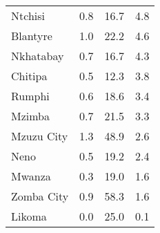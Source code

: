 \begin{tabular}{lrrr}
Ntchisi        &         0.8 &         16.7 &              4.8 \\
Blantyre       &         1.0 &         22.2 &              4.6 \\
Nkhatabay      &         0.7 &         16.7 &              4.3 \\
Chitipa        &         0.5 &         12.3 &              3.8 \\
Rumphi         &         0.6 &         18.6 &              3.4 \\
Mzimba         &         0.7 &         21.5 &              3.3 \\
Mzuzu City     &         1.3 &         48.9 &              2.6 \\
Neno           &         0.5 &         19.2 &              2.4 \\
Mwanza         &         0.3 &         19.0 &              1.6 \\
Zomba City     &         0.9 &         58.3 &              1.6 \\
Likoma         &         0.0 &         25.0 &              0.1 \\
\bottomrule
\end{tabular}
